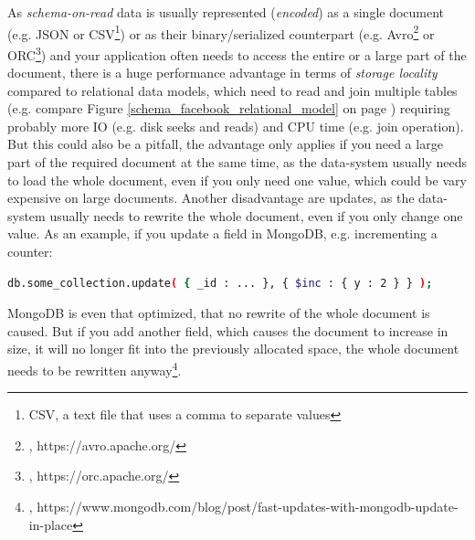 {
As \textit{schema-on-read} data is usually represented (\textit{encoded}) as a single document (e.g. JSON or CSV\footnote{CSV, a text file that uses a comma to separate values}) or as their binary/serialized counterpart (e.g. Avro\footnote{\cite{AVRO}, https://avro.apache.org/} or ORC\footnote{\cite{ORC}, https://orc.apache.org/}) and your application often needs to access the entire or a large part of the document, there is a huge performance advantage in terms of \textit{storage locality} compared to relational data models, which need to read and join multiple tables (e.g. compare Figure \ref{schema_facebook_relational_model} on page \pageref{schema_facebook_relational_model}) requiring probably more IO (e.g. disk seeks and reads) and CPU time (e.g. join operation).
But this could also be a pitfall, the advantage only applies if you need a large part of the required document at the same time, as the data-system usually needs to load the whole document, even if you only need one value, which could be vary expensive on large documents. 
Another disadvantage are updates, as the data-system usually needs to rewrite the whole document, even if you only change one value. As an example, if you update a field in MongoDB, e.g. incrementing a counter:
\begin{lstlisting}[language=bash,frame=none,numbers=none,xleftmargin=0.05\textwidth,xrightmargin=0.05\textwidth]
 db.some_collection.update( { _id : ... }, { $inc : { y : 2 } } );
\end{lstlisting}
MongoDB is even that optimized, that no rewrite of the whole document is caused. But if you add another field, which causes the document to increase in size, it will no longer fit into the previously allocated space, the whole document needs to be rewritten anyway\footnote{\cite{MDBIP}, https://www.mongodb.com/blog/post/fast-updates-with-mongodb-update-in-place}.

}
